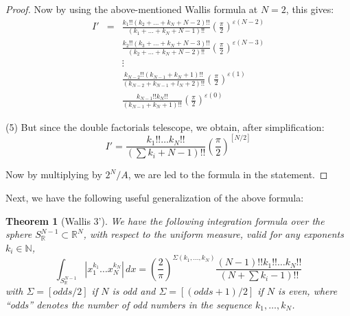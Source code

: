 \documentclass[12pt]{amsbook}
\newtheorem{theorem}{Theorem}[chapter]
\begin{document}
\begin{proof}
Now by using the above-mentioned Wallis formula at $N=2$, this gives:
\begin{eqnarray*}
I'
&=&\frac{k_1!!(k_2+\ldots+k_N+N-2)!!}{(k_1+\ldots+k_N+N-1)!!}\left(\frac{\pi}{2}\right)^{\varepsilon(N-2)}\\
&&\frac{k_2!!(k_3+\ldots+k_N+N-3)!!}{(k_2+\ldots+k_N+N-2)!!}\left(\frac{\pi}{2}\right)^{\varepsilon(N-3)}\\
&&\vdots\\
&&\frac{k_{N-2}!!(k_{N-1}+k_N+1)!!}{(k_{N-2}+k_{N-1}+l_N+2)!!}\left(\frac{\pi}{2}\right)^{\varepsilon(1)}\\
&&\frac{k_{N-1}!!k_N!!}{(k_{N-1}+k_N+1)!!}\left(\frac{\pi}{2}\right)^{\varepsilon(0)}
\end{eqnarray*}

(5) But since the double factorials telescope, we obtain, after simplification:
$$I'=\frac{k_1!!\ldots k_N!!}{(\sum k_i+N-1)!!}\left(\frac{\pi}{2}\right)^{[N/2]}$$

Now by multiplying by $2^N/A$, we are led to the formula in the statement.
\end{proof}

Next, we have the following useful generalization of the above formula:


\begin{theorem}[Wallis 3']
We have the following integration formula over the sphere $S^{N-1}_\mathbb R\subset\mathbb R^N$, with respect to the uniform measure, valid for any exponents $k_i\in\mathbb N$,
$$\int_{S^{N-1}_\mathbb R}|x_1^{k_1}\ldots x_N^{k_N}|\,dx=\left(\frac{2}{\pi}\right)^{\Sigma(k_1,\ldots,k_N)}\frac{(N-1)!!k_1!!\ldots k_N!!}{(N+\sum k_i-1)!!}$$
with $\Sigma=[odds/2]$ if $N$ is odd and $\Sigma=[(odds+1)/2]$ if $N$ is even, where ``odds'' denotes the number of odd numbers in the sequence $k_1,\ldots,k_N$.
\end{theorem}
\end{document}
